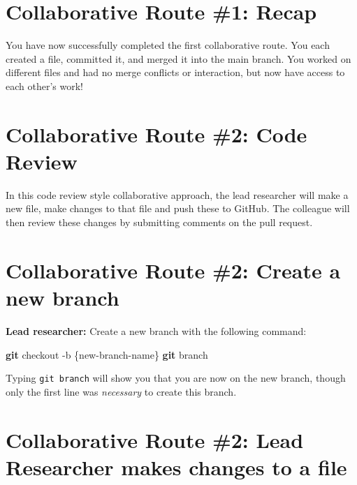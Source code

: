 \documentclass[
]{book}
\newenvironment{Shaded}{\begin{snugshade}}{\end{snugshade}}
\newcommand{\AttributeTok}[1]{\textcolor[rgb]{0.13,0.29,0.53}{#1}}
\newcommand{\FunctionTok}[1]{\textcolor[rgb]{0.13,0.29,0.53}{\textbf{#1}}}
\newcommand{\NormalTok}[1]{#1}
\begin{document}
\hypertarget{collaborative-route-1-recap}{%
\section{Collaborative Route \#1: Recap}\label{collaborative-route-1-recap}}

You have now successfully completed the first collaborative route. You each created a file, committed it, and merged it into the main branch. You worked on different files and had no merge conflicts or interaction, but now have access to each other's work!

\hypertarget{collaborative-route-2-code-review}{%
\section{Collaborative Route \#2: Code Review}\label{collaborative-route-2-code-review}}

In this code review style collaborative approach, the lead researcher will make a new file, make changes to that file and push these to GitHub. The colleague will then review these changes by submitting comments on the pull request.

\hypertarget{collaborative-route-2-create-a-new-branch}{%
\section{Collaborative Route \#2: Create a new branch}\label{collaborative-route-2-create-a-new-branch}}

\textbf{Lead researcher:} Create a new branch with the following command:

\begin{Shaded}
\begin{Highlighting}[]
\FunctionTok{git}\NormalTok{ checkout }\AttributeTok{{-}b}\NormalTok{ \{new{-}branch{-}name\}}
\FunctionTok{git}\NormalTok{ branch}
\end{Highlighting}
\end{Shaded}

Typing \texttt{git\ branch} will show you that you are now on the new branch, though only the first line was \emph{necessary} to create this branch.

\hypertarget{collaborative-route-2-lead-researcher-makes-changes-to-a-file}{%
\section{Collaborative Route \#2: Lead Researcher makes changes to a file}\label{collaborative-route-2-lead-researcher-makes-changes-to-a-file}}
\end{document}
